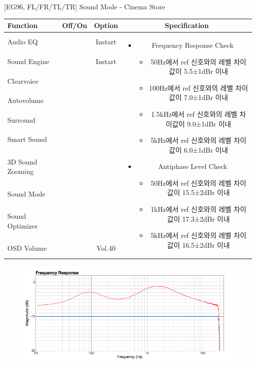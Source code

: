 \documentclass{beamer}
\begin{document}
\begin{frame}[t]{[EG96, FL/FR/TL/TR] Sound Mode - Cinema Store}
\begin{tiny}
\begin{tabular}{@{}lccc@{}}
\toprule
Function & Off/On & Option & Specification \\
\midrule
Audio EQ & \color{black}{Off} & Instart &
\multirow{10}{60mm}{
\begin{itemize}
\item Frequency Response Check
	\begin{itemize}
	\item 50Hz에서 ref 신호와의 레벨 차이값이 5.5±1dBr 이내
	\item 100Hz에서 ref 신호와의 레벨 차이값이 7.0±1dBr 이내
	\item 1.5kHz에서 ref 신호와의 레벨 차이값이 9.0±1dBr 이내
	\item 5kHz에서 ref 신호와의 레벨 차이값이 6.0±1dBr 이내
	\end{itemize}
\item Antiphase Level Check
	\begin{itemize}
	\item 50Hz에서 ref 신호와의 레벨 차이값이 15.5±2dBr 이내
	\item 1kHz에서 ref 신호와의 레벨 차이값이 17.3±2dBr 이내
	\item 5kHz에서 ref 신호와의 레벨 차이값이 16.5±2dBr 이내
	\end{itemize}
\end{itemize}
} \\
Sound Engine & \color{blue}{On} & Instart & \\
Clearvoice & \color{black}{Off} & & \\
Autovolume & \color{black}{Off} & & \\
Surround & \color{black}{Off} & & \\
Smart Sound & \color{black}{Off} & & \\
3D Sound Zooming & \color{black}{Off} & & \\
Sound Mode & \color{blue}{On} & \color{blue}{Cinema} & \\
Sound Optimizer & \color{black}{Off} & & \\
OSD Volume & \color{blue}{On} & Vol.40 & \\
\midrule
\end{tabular}
\end{tiny}

\begin{figure}[b]
\includegraphics[height=0.4\textwidth]{figure/EG96/cinema_store.png}
\end{figure}

\end{frame}
\end{document}
